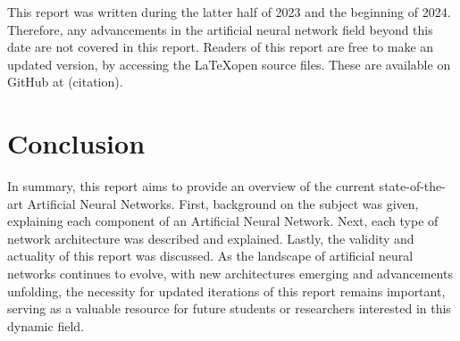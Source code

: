 \documentclass[conference]{IEEEtran}
\begin{document}
This report was written during the latter half of 2023 and the beginning of 2024. Therefore, any advancements in the artificial neural network field beyond this date are not covered in this report. Readers of this report are free to make an updated version, by accessing the \LaTeX \space open source files. These are available on GitHub at (citation). %

\section{Conclusion} \label{Conclusion} %
In summary, this report aims to provide an overview of the current state-of-the-art Artificial Neural Networks. First, background on the subject was given, explaining each component of an Artificial Neural Network. Next, each type of network architecture was described and explained. Lastly, the validity and actuality of this report was discussed. As the landscape of artificial neural networks continues to evolve, with new architectures emerging and advancements unfolding, the necessity for updated iterations of this report remains important, serving as a valuable resource for future students or researchers interested in this dynamic field.







\end{document}
